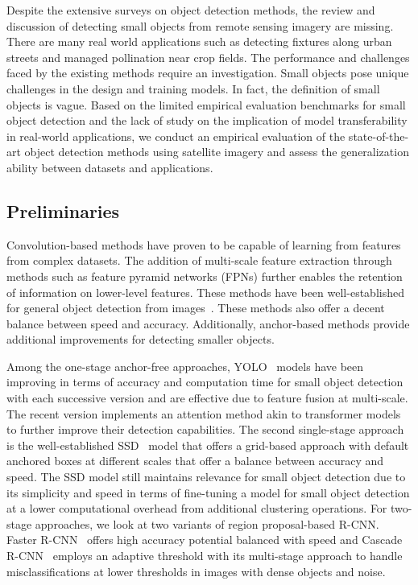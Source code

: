 Despite the extensive surveys on object detection methods, the review and discussion of detecting small objects from remote sensing imagery are missing. There are many real world applications such as detecting fixtures along urban streets and managed pollination near crop fields. The performance and challenges faced by the existing methods require an investigation. Small objects pose unique challenges in the design and training models. In fact, the definition of small objects is vague. %
Based on the limited empirical evaluation benchmarks for small object detection and the lack of study on the implication of model transferability in real-world applications, we conduct an empirical evaluation of the state-of-the-art object detection methods using satellite imagery and assess the generalization ability between datasets and applications.



\subsection{Preliminaries}

Convolution-based methods have proven to be capable of learning from features from complex datasets. The addition of multi-scale feature extraction through methods such as feature pyramid networks (FPNs) further enables the retention of information on lower-level features. These methods have been well-established for general object detection from images~\cite{2024Sun}. These methods also offer a decent balance between speed and accuracy. Additionally, anchor-based methods provide additional improvements for detecting smaller objects.

Among the one-stage anchor-free approaches, YOLO~\cite{2016Redmon} models have been improving in terms of accuracy and computation time for small object detection with each successive version and are effective due to feature fusion at multi-scale. The recent version implements an attention method akin to transformer models to further improve their detection capabilities. The second single-stage approach is the well-established SSD~\cite{2016Liu} model that offers a grid-based approach with default anchored boxes at different scales that offer a balance between accuracy and speed. The SSD model still maintains relevance for small object detection due to its simplicity and speed in terms of fine-tuning a model for small object detection at a lower computational overhead from additional clustering operations. For two-stage approaches, we look at two variants of region proposal-based R-CNN. Faster R-CNN~\cite{2016Shaoqing} offers high accuracy potential balanced with speed and Cascade R-CNN~\cite{2018Cai} employs an adaptive threshold with its multi-stage approach to handle misclassifications at lower thresholds in images with dense objects and noise.

